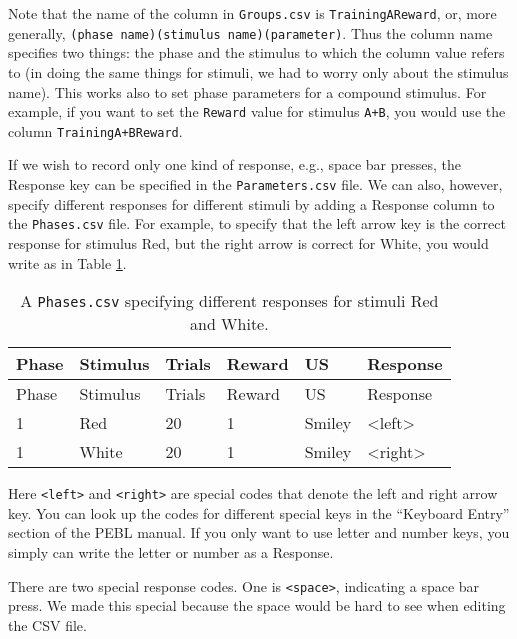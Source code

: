\documentclass[11pt,]{article}
\begin{document}
Note that the name of the column in \texttt{Groups.csv} is
\texttt{TrainingAReward}, or, more generally,
\texttt{(phase name)(stimulus name)(parameter)}. Thus the column name
specifies two things: the phase and the stimulus to which the column
value refers to (in doing the same things for stimuli, we had to worry
only about the stimulus name). This works also to set phase parameters
for a compound stimulus. For example, if you want to set the
\texttt{Reward} value for stimulus \texttt{A+B}, you would use the
column \texttt{TrainingA+BReward}.


If we wish to record only one kind of response, e.g., space bar presses,
the Response key can be specified in the \texttt{Parameters.csv} file.
We can also, however, specify different responses for different stimuli
by adding a Response column to the \texttt{Phases.csv} file. For
example, to specify that the left arrow key is the correct response for
stimulus Red, but the right arrow is correct for White, you would write
as in Table \ref{per-stimulus-responses}.

\begin{longtable}[c]{@{}llllll@{}}
\caption{A \texttt{Phases.csv} specifying different responses for
stimuli Red and White. \label{per-stimulus-responses}}\tabularnewline
\toprule
Phase & Stimulus & Trials & Reward & US & Response\tabularnewline
\midrule
\endfirsthead
\toprule
Phase & Stimulus & Trials & Reward & US & Response\tabularnewline
\midrule
\endhead
1 & Red & 20 & 1 & Smiley & \textless{}left\textgreater{}\tabularnewline
1 & White & 20 & 1 & Smiley &
\textless{}right\textgreater{}\tabularnewline
\bottomrule
\end{longtable}

Here \texttt{\textless{}left\textgreater{}} and
\texttt{\textless{}right\textgreater{}} are special codes that denote
the left and right arrow key. You can look up the codes for different
special keys in the ``Keyboard Entry'' section of the PEBL manual. If
you only want to use letter and number keys, you simply can write the
letter or number as a Response.

There are two special response codes. One is
\texttt{\textless{}space\textgreater{}}, indicating a space bar press.
We made this special because the space would be hard to see when editing
the CSV file.
\end{document}
